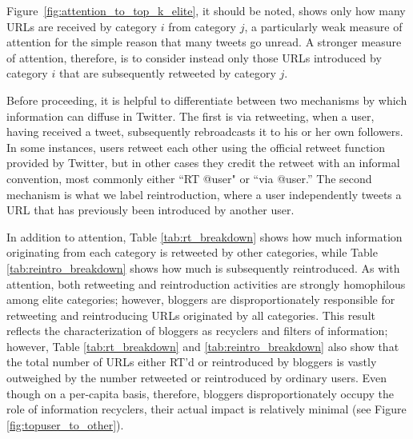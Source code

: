 \documentclass[phd,tocprelim]{cornell}
\begin{document}
Figure~\ref{fig:attention_to_top_k_elite}, it should be noted, shows only how many URLs
are received by category $i$ from category $j$, a particularly
weak measure of attention for the simple reason that many
tweets go unread. A stronger measure of attention, therefore,
is to consider instead only those URLs introduced by
category $i$ that are subsequently retweeted by category $j$.
 
Before proceeding, it is helpful to differentiate between two mechanisms by
which information can diffuse in Twitter. The first is via retweeting, when
a user, having received a tweet, subsequently rebroadcasts it to his or her
own followers. In some instances, users retweet each other using the
official retweet function provided by Twitter, but in other cases they
credit the retweet with an informal convention, most commonly either ``RT
@user" or ``via @user.'' The second mechanism is what we label
reintroduction, where a user independently tweets a URL that has previously
been introduced by another user.

In addition to attention, Table \ref{tab:rt_breakdown} shows how much
information originating from each category is retweeted by other
categories, while Table \ref{tab:reintro_breakdown} shows how much is
subsequently reintroduced.  As with attention, both retweeting and
reintroduction activities are strongly homophilous among elite categories;
however, bloggers are disproportionately responsible for retweeting and
reintroducing URLs originated by all categories. This result reflects the
characterization of bloggers as recyclers and filters of information;
however, Table \ref{tab:rt_breakdown} and \ref{tab:reintro_breakdown} also
show that the total number of URLs either RT'd or reintroduced by bloggers
is vastly outweighed by the number retweeted or reintroduced by ordinary
users.  Even though on a per-capita basis, therefore, bloggers
disproportionately occupy the role of information recyclers, their actual
impact is relatively minimal (see Figure \ref{fig:topuser_to_other}).
\end{document}
